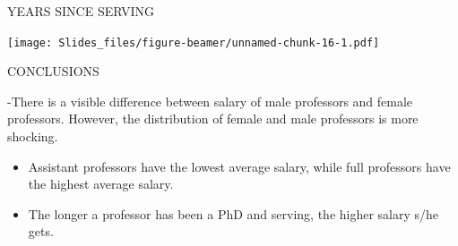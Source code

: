 \documentclass[ignorenonframetext,]{beamer}
\newenvironment{Shaded}{\begin{snugshade}}{\end{snugshade}}
\newcommand{\KeywordTok}[1]{\textcolor[rgb]{0.13,0.29,0.53}{\textbf{#1}}}
\newcommand{\DataTypeTok}[1]{\textcolor[rgb]{0.13,0.29,0.53}{#1}}
\newcommand{\DecValTok}[1]{\textcolor[rgb]{0.00,0.00,0.81}{#1}}
\newcommand{\FloatTok}[1]{\textcolor[rgb]{0.00,0.00,0.81}{#1}}
\newcommand{\StringTok}[1]{\textcolor[rgb]{0.31,0.60,0.02}{#1}}
\newcommand{\OtherTok}[1]{\textcolor[rgb]{0.56,0.35,0.01}{#1}}
\newcommand{\OperatorTok}[1]{\textcolor[rgb]{0.81,0.36,0.00}{\textbf{#1}}}
\newcommand{\NormalTok}[1]{#1}
\begin{document}
\begin{frame}[fragile]
\begin{block}{YEARS SINCE SERVING}
\begin{Shaded}
\end{Shaded}

\texttt{[image: Slides\_files/figure-beamer/unnamed-chunk-16-1.pdf]}

\end{block}

\begin{block}{CONCLUSIONS}

-There is a visible difference between salary of male professors and
female professors. However, the distribution of female and male
professors is more shocking.

\begin{itemize}
\item
  Assistant professors have the lowest average salary, while full
  professors have the highest average salary.
\item
  The longer a professor has been a PhD and serving, the higher salary
  s/he gets.
\end{itemize}

\end{block}

\end{frame}
\end{document}
